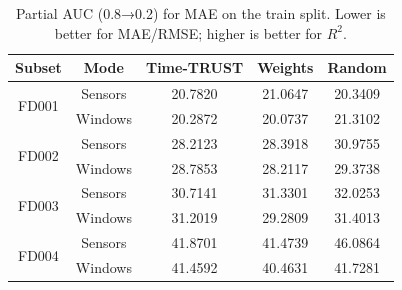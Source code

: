 \begin{table}[t]
\centering
\caption{Partial AUC (0.8→0.2) for MAE on the train split. Lower is better for MAE/RMSE; higher is better for $R^2$.}
\label{tab:auc_mae_train}
\begin{tabular}{|c|c|c|c|c|}
\hline
Subset & Mode & Time-TRUST & Weights & Random \\
\hline
\multirow{2}{*}{FD001} & Sensors & 20.7820 & 21.0647 & 20.3409 \\
 & Windows & 20.2872 & 20.0737 & 21.3102 \\
\hline
\multirow{2}{*}{FD002} & Sensors & 28.2123 & 28.3918 & 30.9755 \\
 & Windows & 28.7853 & 28.2117 & 29.3738 \\
\hline
\multirow{2}{*}{FD003} & Sensors & 30.7141 & 31.3301 & 32.0253 \\
 & Windows & 31.2019 & 29.2809 & 31.4013 \\
\hline
\multirow{2}{*}{FD004} & Sensors & 41.8701 & 41.4739 & 46.0864 \\
 & Windows & 41.4592 & 40.4631 & 41.7281 \\
\hline
\end{tabular}
\end{table}
